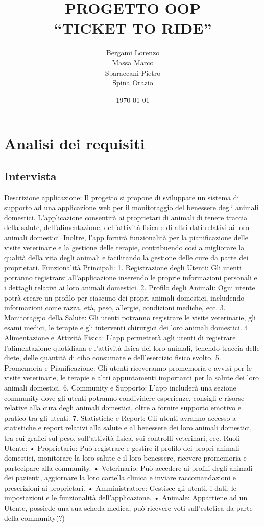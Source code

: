 \documentclass[a4paper,12pt]{report}
\title{PROGETTO OOP\\``TICKET TO RIDE''}
\author{Bergami Lorenzo\\
Massa Marco\\
Sbaraccani Pietro\\
Spina Orazio}
\date{\today}
\begin{document}
\maketitle

\tableofcontents
\chapter{Analisi dei requisiti}
\section{Intervista}
Descrizione applicazione:
Il progetto si propone di sviluppare un sistema di supporto ad una applicazione web per il monitoraggio del benessere degli animali domestici. L'applicazione consentirà ai proprietari di animali di tenere traccia della salute, dell'alimentazione, dell'attività fisica e di altri dati relativi ai loro animali domestici. Inoltre, l'app fornirà funzionalità per la pianificazione delle visite veterinarie e la gestione delle terapie, contribuendo così a migliorare la qualità della vita degli animali e facilitando la gestione delle cure da parte dei proprietari.
Funzionalità Principali:
1.	Registrazione degli Utenti: Gli utenti potranno registrarsi all'applicazione inserendo le proprie informazioni personali e i dettagli relativi ai loro animali domestici.
2.	Profilo degli Animali: Ogni utente potrà creare un profilo per ciascuno dei propri animali domestici, includendo informazioni come razza, età, peso, allergie, condizioni mediche, ecc.
3.	Monitoraggio della Salute: Gli utenti potranno registrare le visite veterinarie, gli esami medici, le terapie e gli interventi chirurgici dei loro animali domestici.
4.	Alimentazione e Attività Fisica: L'app permetterà agli utenti di registrare l'alimentazione quotidiana e l'attività fisica dei loro animali, tenendo traccia delle diete, delle quantità di cibo consumate e dell'esercizio fisico svolto.
5.	Promemoria e Pianificazione: Gli utenti riceveranno promemoria e avvisi per le visite veterinarie, le terapie e altri appuntamenti importanti per la salute dei loro animali domestici.
6.	Community e Supporto: L'app includerà una sezione community dove gli utenti potranno condividere esperienze, consigli e risorse relative alla cura degli animali domestici, oltre a fornire supporto emotivo e pratico tra gli utenti.
7.	Statistiche e Report: Gli utenti avranno accesso a statistiche e report relativi alla salute e al benessere dei loro animali domestici, tra cui grafici sul peso, sull'attività fisica, sui controlli veterinari, ecc.
Ruoli Utente:
•	Proprietario: Può registrare e gestire il profilo dei propri animali domestici, monitorare la loro salute e il loro benessere, ricevere promemoria e partecipare alla community.
•	Veterinario: Può accedere ai profili degli animali dei pazienti, aggiornare la loro cartella clinica e inviare raccomandazioni e prescrizioni ai proprietari.
•	Amministratore: Gestisce gli utenti, i dati, le impostazioni e le funzionalità dell'applicazione.
•	Animale: Appartiene ad un Utente, possiede una sua scheda medica, può ricevere voti sull’estetica da parte della community(?)
\end{document}
